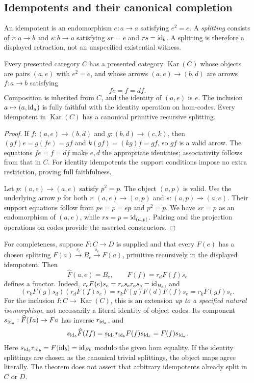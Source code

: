 \subsection{Idempotents and their canonical completion}

An idempotent is an endomorphism $e:a\to a$ satisfying $e^2=e$.  A
\emph{splitting} consists of $r:a\to b$ and $s:b\to a$ satisfying
$sr=e$ and $rs=\operatorname{id}_b$.  A splitting is therefore a displayed retraction,
not an unspecified existential witness.

\begin{theorem}\label{thm:karoubi}
Every presented category $C$ has a presented category $\operatorname{Kar}(C)$
whose objects are pairs $(a,e)$ with $e^2=e$, and whose arrows
$(a,e)\to(b,d)$ are arrows $f:a\to b$ satisfying
\[
 fe=f=df.
\]
Composition is inherited from $C$, and the identity of $(a,e)$ is $e$.
The inclusion $a\mapsto(a,\operatorname{id}_a)$ is fully faithful with the identity
operation on hom-codes.  Every idempotent in $\operatorname{Kar}(C)$ has a
canonical primitive recursive splitting.
\end{theorem}
\begin{proof}
If $f:(a,e)\to(b,d)$ and $g:(b,d)\to(c,k)$, then
$(gf)e=g(fe)=gf$ and $k(gf)=(kg)f=gf$, so $gf$ is a valid arrow.
The equations $fe=f=df$ make $e,d$ the appropriate identities;
associativity follows from that in $C$.  For identity idempotents the support
conditions impose no extra restriction, proving full faithfulness.

Let $p:(a,e)\to(a,e)$ satisfy $p^2=p$.  The object $(a,p)$ is valid.
Use the underlying arrow $p$ for both
$r:(a,e)\to(a,p)$ and $s:(a,p)\to(a,e)$.  Their support equations follow
from $pe=p=ep$ and $p^2=p$.  We have $sr=p$ as an endomorphism of $(a,e)$,
while $rs=p=\operatorname{id}_{(a,p)}$.  Pairing and the projection operations on codes
provide the asserted constructors.
\end{proof}

For completeness, suppose $F:C\to D$ is supplied and that every $F(e)$ has
a chosen splitting $F(a)\xrightarrow{r_e}B_e\xrightarrow{s_e}F(a)$,
primitive recursively in the displayed idempotent.  Then
\[
 \widehat F(a,e)=B_e,\qquad
 \widehat F(f)=r_d F(f)s_e
\]
defines a functor.  Indeed,
$r_eF(e)s_e=r_es_er_es_e=\operatorname{id}_{B_e}$, and
\[
 (r_kF(g)s_d)(r_dF(f)s_e)
 =r_kF(g)F(d)F(f)s_e
 =r_kF(gf)s_e.
\]
For the inclusion $I:C\to\operatorname{Kar}(C)$, this is an extension
\emph{up to a specified natural isomorphism}, not necessarily a literal
identity of object codes.  Its component
$s_{\operatorname{id}_a}:\widehat F(Ia)\to Fa$ has inverse $r_{\operatorname{id}_a}$, and
\[
 s_{\operatorname{id}_b}\widehat F(I f)
 =s_{\operatorname{id}_b}r_{\operatorname{id}_b}F(f)s_{\operatorname{id}_a}
 =F(f)s_{\operatorname{id}_a}.
\]
Here $s_{\operatorname{id}_b}r_{\operatorname{id}_b}=F(\operatorname{id}_b)=\operatorname{id}_{Fb}$ modulo the given hom equality.
If the identity splittings are chosen as the canonical trivial splittings,
the object maps agree literally.  The theorem does not assert that arbitrary
idempotents already split in $C$ or $D$.

